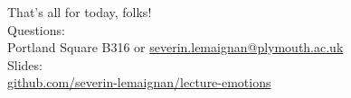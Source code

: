 \documentclass[compress]{beamer}
\makeatletter
\def\beamer@writeslidentry@miniframesoff{%
  \expandafter\beamer@ifempty\expandafter{\beamer@framestartpage}{}%
  {%
    \clearpage\beamer@notesactions%
  }
}
\newcommand*{\miniframesoff}{\let\beamer@writeslidentry=\beamer@writeslidentry@miniframesoff}
\makeatother
\begin{document}
\miniframesoff

\begin{frame}{}
    \begin{center}
        \Large
        That's all for today, folks!\\[2em]
        \normalsize
        Questions:\\
        Portland Square B316 or \url{severin.lemaignan@plymouth.ac.uk} \\[1em]

        Slides:\\
        \href{https://github.com/severin-lemaignan/lecture-emotions}{\small
        github.com/severin-lemaignan/lecture-emotions}

    \end{center}
\end{frame}
\end{document}
